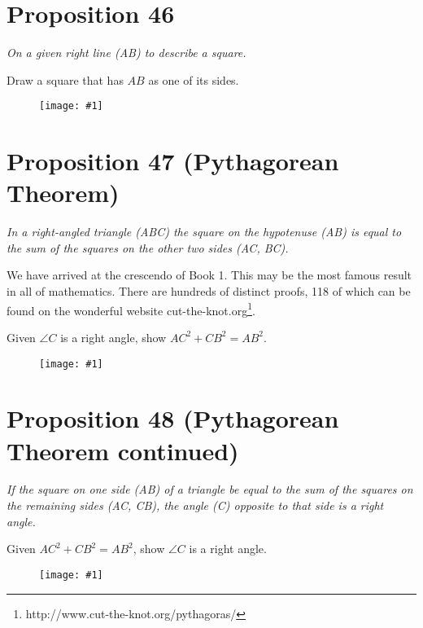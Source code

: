 \documentclass[openany]{book}
\newcommand{\diagram}[1]{
    \vspace*{\fill}
    \begin{figure}[H]
        \centering
        \texttt{[image: \#1]}
    \end{figure}
    \vspace*{\fill}
}
\newenvironment{proposition}
    {\begin{center}\em}
    {\end{center}}
\begin{document}
    \clearpage
    \section{Proposition 46}
    \begin{proposition}
    On a given right line (AB) to describe a square.
    \end{proposition}
    Draw a square that has $AB$ as one of its sides.
    \diagram{prop46.pdf}


    \clearpage
    \section{Proposition 47 (Pythagorean Theorem)}
    \begin{proposition}
    In a right-angled triangle (ABC) the square on the hypotenuse (AB) is equal to the sum of the squares on the other two sides (AC, BC).
    \end{proposition}
    We have arrived at the crescendo of Book 1. This may be the most famous result in all of mathematics. There are hundreds of distinct proofs, 118 of which can be found on the wonderful website cut-the-knot.org\footnote{http://www.cut-the-knot.org/pythagoras/}.

    Given $\angle{C}$ is a right angle, show $AC^2 + CB^2 = AB^2$.
    \diagram{prop47.pdf}


    \clearpage
    \section{Proposition 48 (Pythagorean Theorem continued)}
    \begin{proposition}
    If the square on one side (AB) of a triangle be equal to the sum of the squares on the remaining sides (AC, CB),
    the angle (C) opposite to that side is a right angle.
    \end{proposition}
    Given $AC^2 + CB^2 = AB^2$, show $\angle{C}$ is a right angle.
    \diagram{prop48.pdf}
\end{document}
